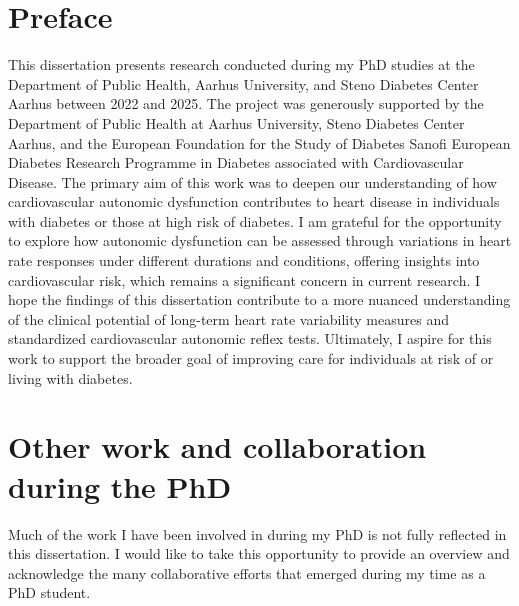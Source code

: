\documentclass[
  a4paper,
  headsepline=true,
  open=left]{scrbook}
\begin{document}

\hypertarget{sec-preface}{%
\chapter*{Preface}\label{sec-preface}}


This dissertation presents research conducted during my PhD studies at
the Department of Public Health, Aarhus University, and Steno Diabetes
Center Aarhus between 2022 and 2025. The project was generously
supported by the Department of Public Health at Aarhus University, Steno
Diabetes Center Aarhus, and the European Foundation for the Study of
Diabetes Sanofi European Diabetes Research Programme in Diabetes
associated with Cardiovascular Disease. The primary aim of this work was
to deepen our understanding of how cardiovascular autonomic dysfunction
contributes to heart disease in individuals with diabetes or those at
high risk of diabetes. I am grateful for the opportunity to explore how
autonomic dysfunction can be assessed through variations in heart rate
responses under different durations and conditions, offering insights
into cardiovascular risk, which remains a significant concern in current
research. I hope the findings of this dissertation contribute to a more
nuanced understanding of the clinical potential of long-term heart rate
variability measures and standardized cardiovascular autonomic reflex
tests. Ultimately, I aspire for this work to support the broader goal of
improving care for individuals at risk of or living with diabetes.

\newpage


\hypertarget{sec-preface}{%
\chapter*{Other work and collaboration during the
PhD}\label{sec-preface}}


Much of the work I have been involved in during my PhD is not fully
reflected in this dissertation. I would like to take this opportunity to
provide an overview and acknowledge the many collaborative efforts that
emerged during my time as a PhD student.
\end{document}
